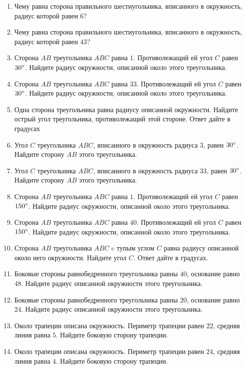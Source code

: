 \documentclass[12pt, a4paper]{article}
\begin{document}
\begin{enumerate}
		\item Чему равна сторона правильного шестиугольника, вписанного в окружность, радиус которой равен \( 6\)?
		\item Чему равна сторона правильного шестиугольника, вписанного в окружность, радиус которой равен \( 43 \)?
		\item Сторона \( AB  \) треугольника \( ABC  \) равна \( 1 \). Противолежащий ей угол \( C  \) равен \( 30\degree\). Найдите радиус окружности, описанной около этого треугольника.
		\item Сторона \( AB  \) треугольника \( ABC  \) равна \(  33 \). Противолежащий ей угол \( C  \) равен \( 30  \degree\). Найдите радиус окружности, описанной около этого треугольника.
		\item Одна сторона треугольника равна радиусу описанной окружности. Найдите острый угол треугольника, противолежащий этой стороне. Ответ дайте в градусах
		\item Угол \( C \) треугольника \( ABC \), вписанного в окружность радиуса \( 3 \), равен \( 30\degree\). Найдите сторону \( AB  \) этого треугольника.
		\item Угол \( C  \) треугольника \( ABC \), вписанного в окружность радиуса 33, равен \( 30  \degree\). Найдите сторону \( AB  \) этого треугольника.
		\item Сторона \( AB  \) треугольника \( ABC  \) равна \( 1 \). Противолежащий ей угол \( C  \) равен \( 150\degree\). Найдите радиус окружности, описанной около этого треугольника.
		\item Сторона \( AB  \) треугольника \( ABC  \) равна \( 40 \). Противолежащий ей угол \( C  \) равен \( 150  \degree\). Найдите радиус окружности, описанной около этого треугольника.
		\item Сторона \( AB  \) треугольника \( ABC  \) c тупым углом \( C  \) равна радиусу описанной около него окружности. Найдите угол \( C \). Ответ дайте в градусах.
		\item Боковые стороны равнобедренного треугольника равны \( 40 \), основание равно \( 48 \). Найдите радиус описанной окружности этого треугольника.
		\item Боковые стороны равнобедренного треугольника равны \( 20 \), основание равно \( 24 \). Найдите радиус описанной окружности этого треугольника.
		\item Около трапеции описана окружность. Периметр трапеции равен \( 22 \), средняя линия равна \( 5 \). Найдите боковую сторону трапеции.
		\item Около трапеции описана окружность. Периметр трапеции равен \( 24 \), средняя линия равна \( 4 \). Найдите боковую сторону трапеции.

\end{enumerate}
\end{document}
